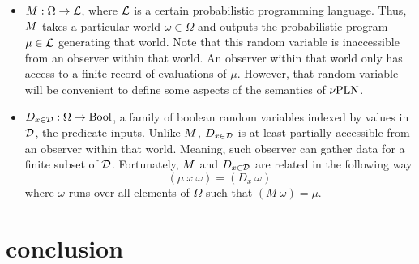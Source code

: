 \documentclass[]{article}
\begin{document}
\begin{itemize}
\item $M : \Omega \to \mathcal{L}$, where $\mathcal{L}$ is a certain
  probabilistic programming language.  Thus, $M$ takes a particular
  world $\omega \in \Omega$ and outputs the probabilistic program $\mu
  \in \mathcal{L}$ generating that world.  Note that this random
  variable is inaccessible from an observer within that world.  An
  observer within that world only has access to a finite record of
  evaluations of $\mu$.  However, that random variable will be
  convenient to define some aspects of the semantics of $\nu\textup{PLN}$.
\item $D_{x\in\mathcal{D}} : \Omega \to \textup{Bool}$, a family of boolean random variables
  indexed by values in $\mathcal{D}$, the predicate inputs.  Unlike
  $M$, $D_{x\in\mathcal{D}}$ is at least partially accessible from an observer
  within that world.  Meaning, such observer can gather data for a
  finite subset of $\mathcal{D}$.  Fortunately, $M$ and $D_{x\in\mathcal{D}}$ are
  related in the following way
  $$(\mu\ x\ \omega) = (D_x\ \omega)$$ where $\omega$ runs over all
  elements of $\Omega$ such that $(M\ \omega) = \mu$.
\end{itemize}
\section{conclusion}



\end{document}
